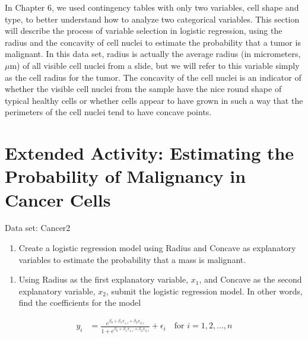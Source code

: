 \documentclass[
]{report}
\providecommand{\tightlist}{%
  \setlength{\itemsep}{0pt}\setlength{\parskip}{0pt}}
\begin{document}
In Chapter 6, we used contingency tables with only two variables, cell shape and type, to better understand how to analyze two categorical variables. This section will describe the process of variable selection in logistic regression, using the radius and the concavity of cell nuclei to estimate the probability that a tumor is malignant. In this data set, radius is actually the average radius (in micrometers, \(\mu\)m) of all visible cell nuclei from a slide, but we will refer to this variable simply as the cell radius for the tumor. The concavity of the cell nuclei is an indicator of whether the visible cell nuclei from the sample have the nice round shape of typical healthy cells or whether cells appear to have grown in such a way that the perimeters of the cell nuclei tend to have concave points.

\section*{Extended Activity: Estimating the Probability of Malignancy in Cancer Cells}\label{extended-activity-estimating-the-probability-of-malignancy-in-cancer-cells}

Data set: Cancer2

\begin{enumerate}
\def\labelenumi{\arabic{enumi}.}
\setcounter{enumi}{14}
\tightlist
\item
  Create a logistic regression model using Radius and Concave as explanatory variables to estimate the probability that a mass is malignant.\\
\end{enumerate}

\begin{enumerate}
\def\labelenumi{\alph{enumi}.}
\tightlist
\item
  Using Radius as the first explanatory variable, \(x_1\), and Concave as the second explanatory variable, \(x_2\), submit the logistic regression model. In other words, find the coefficients for the model
\end{enumerate}

\begin{align}
   y_i &= \frac{e^{\beta_0 + \beta_1 x_{1,i} + \beta_2 x_{2,i}}}{1 + e^{\beta_0 + \beta_1 x_{1,i} + \beta_2 x_{2,i}}} + \epsilon_i \quad \text{for } i = 1,2,\dots,n
\end{align}
\end{document}

